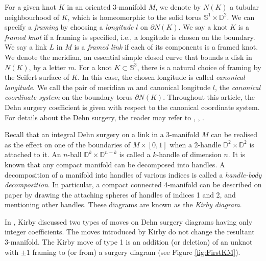 \documentclass{amsart}
\theoremstyle{plain}
\theoremstyle{remark}
\theoremstyle{definition}
\newcommand{\s}{\mathbb{S}}
\newcommand{\D}{\mathbb{D}}
\newcommand{\dd}{\partial}
\begin{document}
For a given knot $K$ in an oriented 3-manifold $M$, we denote by $N(K)$ a tubular neighbourhood of $K$, which is homeomorphic to the solid torus $\s^1 \times \D^2$.
We can specify a \emph{framing} by choosing a {\it longitude} $l$ on $\partial N(K)$. 
We say a knot $K$ is a {\it framed knot} if a framing is specified, i.e., a longitude is chosen on the boundary. 
We say a link $L$ in $M$ is a {\it framed link} if each of its components is a framed knot.
We denote the meridian, an essential simple closed curve that bounds a disk in $N(K)$, by a letter $m$.
For a knot $K\subset \s^3$, there is a natural choice of framing by the Seifert surface of $K$. In this case, the chosen longitude is called {\it canonical longitude}. 
We call the pair of meridian $m$ and canonical longitude $l$, the \textit{canonical coordinate system} on the boundary torus $\dd N(K)$. 
Throughout this article, the Dehn surgery coefficient is given with respect to the canonical coordinate system. 
For details about the Dehn surgery, the reader may refer to \cite{Book-GompfStip}, \cite{Book-Rolfsen}, \cite{Book-S}.

%


Recall that an integral Dehn surgery on a link in a 3-manifold $M$ can be realised as the effect on one of the boundaries of $M \times [0,1]$ when a 2-handle $\D^2 \times \D^2$ is attached to it.
An $n$-ball $\D^k \times \D^{n-k}$ is called a $k$-handle of dimension $n$. 
It is known that any compact manifold can be decomposed into handles. A decomposition of a manifold into handles of various indices is called a {\it handle-body decomposition}.
In particular, a compact connected 4-manifold can be described on paper by drawing the attaching spheres of handles of indices 1 and 2, and mentioning other handles. 
These diagrams are known as the {\it Kirby diagram}.

In \cite{RK}, Kirby discussed two types of moves on Dehn surgery diagrams having only integer coefficients. The moves introduced by Kirby do not change the resultant 3-manifold. 
The Kirby move of type 1 is an addition (or deletion) of an unknot with $\pm1$ framing to (or from) a surgery diagram (see Figure \ref{fig:FirstKM}). 
\end{document}
